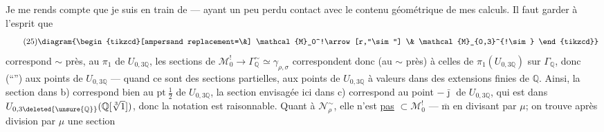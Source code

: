 Je me rends compte que je suis en train
de  --- ayant un peu perdu contact
avec le contenu géométrique de mes
calculs. Il faut garder à l'esprit que
\[
\tag{25}
\diagram{\begin{tikzcd}[ampersand replacement=\&]
\mathcal{M}_0^!\arrow[r,"\sim"] \& \mathcal{M}_{0,3}^{!\sim}
\end{tikzcd}}
\]
correspond  $\sim$ près, au \(\pi_1\) de \(U_{0,3\mathbb Q}\),
les sections de \(\mathcal{M}_0^!\longrightarrow
\Gamma_{\mathbb Q}^{\sim}\simeq\gamma_{\rho,\sigma}\) correspondent
donc (au $\sim$ près) à celles de
\(\pi_1(U_{0,3\mathbb Q})\) sur \(\Gamma_{\mathbb Q}\),
donc (``'') aux points
 de \(U_{0,3\mathbb Q}\)
--- quand ce sont des sections partielles, aux
points de \(U_{0,3\mathbb Q}\) à valeurs dans des extensions
finies de \(\mathbb Q\). Ainsi,  la section
dans b) correspond bien au \(\mathrm{pt}\ \frac12\) de \(U_{0,3\mathbb Q}\),
la section
 envisagée ici dans c) correspond au
point \(-\bar\jmath\) de \(U_{0,3\mathbb Q}\), qui est dans
\(U_{0,3\deleted{\unsure{\mathbb Q}}}(\mathbb Q[\sqrt[3]{1}])\),
donc la notation  est raisonnable.
Quant à \(\mathcal N_\rho^{\sim}\),
elle n'est \uline{pas} \(\subset\mathcal M_0^!\) --- $\overline{\mathrm m}$ en divisant par \(\mu\);
on trouve après division par \(\mu\) une section



